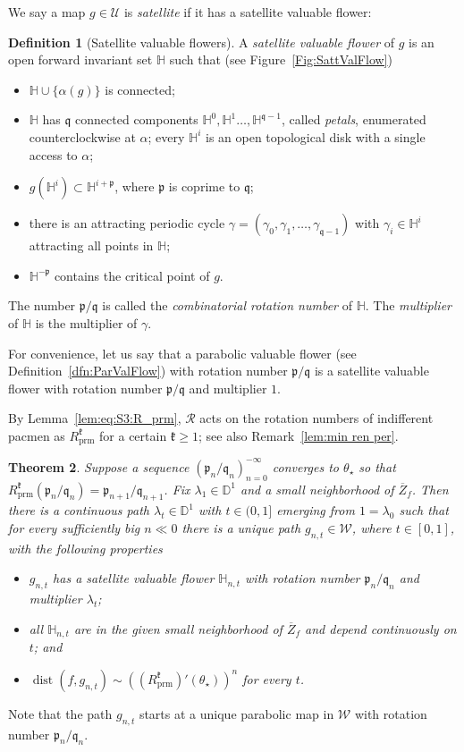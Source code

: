 \documentclass[]{amsart}
\newcommand\RR{\mathcal{R}}
\newcommand\prm{{\operatorname{prm}}}
\newcommand\cRRc{R_{\prm}}%
\newcommand{\fH}{{\mathbb H}}
\newcommand{\str}{{\star}}
\newcommand{\pp}{\mathfrak{p}}
\renewcommand{\qq}{\mathfrak{q}}
\newcommand{\kk}{\mathfrak{k}}
\newcommand\WW{\mathcal{W}}
\newcommand\UU{\mathcal{U}}
\newcommand{\Disk}{\mathbb{D}^1}
\newtheorem{thm}{Theorem}[section]
\theoremstyle{remark}
\numberwithin{equation}{section}
\theoremstyle{definition}
\newtheorem{defn}[thm]{Definition}
\newcommand{\dist}{\operatorname{dist}}
\begin{document}
We say a map $g\in \UU$ is \emph{satellite} if it has a satellite valuable flower: 
\begin{defn}[Satellite valuable flowers]
\label{dfn:SatValFlow}
 A \emph{satellite valuable flower} of $g$ is an open forward invariant set $\fH$ such that (see Figure~\ref{Fig:SattValFlow})
\begin{itemize}
\item[(A)] $\fH\cup \{\alpha(g)\}$ is connected;
\item[(B)] $\fH$ has $\qq$ connected components $\fH^{0}, \fH^{1}\dots ,\fH^{\qq-1}$, called \emph{petals}, enumerated counterclockwise at $\alpha$; every $\fH^{i}$ is an open topological disk with a single access to $\alpha$;
\item[(C)] $g(\fH^{i})\subset \fH^{i + \pp}$, where $\pp$ is coprime to $\qq$;
\item[(D)] there is an attracting periodic cycle $\gamma=(\gamma_0,\gamma_1,\dots, \gamma_{\qq-1})$ with $\gamma_i\in \fH^i$ attracting all points in $\fH$;
\item[(E)] $\fH^{-\pp}$ contains the critical point of $g$.
\end{itemize}
The number $\pp/\qq$ is called the \emph{combinatorial rotation number} of $\fH$. The \emph{multiplier} of $\fH$ is the multiplier of $\gamma$. 
\end{defn}

For convenience, let us say that a parabolic valuable flower (see Definition~\ref{dfn:ParValFlow}) with rotation number $\pp/\qq$ is a satellite valuable flower with rotation number $\pp/\qq$ and multiplier $1$.

By Lemma~\ref{lem:eq:S3:R_prm}, $\RR$ acts on the rotation numbers of indifferent pacmen as $\cRRc^\kk$ for a certain $\kk\ge 1$; see also Remark~\ref{lem:min ren per}. 
\begin{thm}
\label{thm:ScalThm}
Suppose a sequence $(\pp_n/\qq_n)_{n=0}^{-\infty}$ converges to $\theta_\str$ so that $\cRRc^\kk (\pp_n/\qq_n)= \pp_{n+1}/\qq_{n+1}$. Fix $\lambda_1\in \Disk$ and a small neighborhood of $\overline Z_f$. Then there is a continuous path $\lambda_t\in  \Disk$ with $ t\in (0,1]$ emerging from $1=\lambda_0$ such that for every sufficiently big $n\ll0$ there is a unique path $g_{n,t}\in \WW$, where $t\in[0,1]$, with the following properties
\begin{itemize}
\item $g_{n,t}$ has a satellite valuable flower $\fH_{n,t}$ with rotation number $\pp_n/\qq_n$ and multiplier $\lambda_t$;
\item all $\fH_{n,t}$ are in the given small neighborhood of $\overline Z_f$ and depend continuously on $t$; and
\item  $\dist(f, g_{n,t})  \sim \left((\cRRc^\kk)' (\theta_\str) \right)^n$ for every $t$.
\end{itemize}
\end{thm}
\noindent Note that the path $g_{n,t}$ starts at a unique parabolic map in $\WW$ with rotation number $\pp_n/\qq_n$. 
\end{document}

